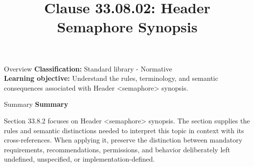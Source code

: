 \documentclass[10pt,letterpaper]{article}
\title{Clause 33.08.02: Header Semaphore Synopsis}
\author{}
\date{}
\begin{document}
\maketitle
\begin{CornellOverviewBox}{Overview}
\textbf{Classification:} Standard library - Normative\\[2pt]
\textbf{Learning objective:} Understand the rules, terminology, and semantic consequences associated with Header <semaphore> synopsis.
\end{CornellOverviewBox}\begin{CornellSummaryBox}{Summary}
{\sffamily\bfseries\color{Accent} Summary}\par\vspace{3pt}Section 33.8.2 focuses on Header <semaphore> synopsis. The section supplies the rules and semantic distinctions needed to interpret this topic in context with its cross-references. When applying it, preserve the distinction between mandatory requirements, recommendations, permissions, and behavior deliberately left undefined, unspecified, or implementation-defined.
\end{CornellSummaryBox}
\end{document}
